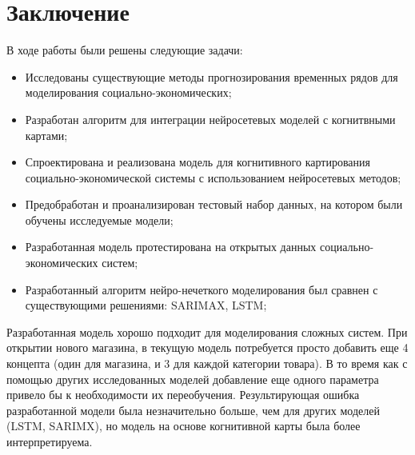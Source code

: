 \chapter*{Заключение}

В ходе работы были решены следующие задачи:



\begin{itemize}
	\item Исследованы существующие методы прогнозирования временных рядов для моделирования социально-экономических;
	\item Разработан алгоритм для интеграции нейросетевых моделей с когнитвными картами;
	\item Спроектирована и реализована модель для когнитивного картирования социально-экономической
	системы с использованием нейросетевых методов;
	\item Предобработан и проанализирован тестовый набор данных, на котором были обучены исследуемые модели;
	\item Разработанная модель протестирована на открытых данных социально-экономических систем;
	\item Разработанный алгоритм нейро-нечеткого моделирования был сравнен с существующими решениями: SARIMAX, LSTM;
\end{itemize}

Разработанная модель хорошо подходит для моделирования сложных систем.
При открытии нового магазина, в текущую модель потребуется просто добавить еще
4 концепта (один для магазина, и 3 для каждой категории товара). В то время
как с помощью других исследованных моделей добавление еще одного параметра
привело бы к необходимости их переобучения.
Результирующая ошибка разработанной модели была незначительно больше,
чем для других моделей (LSTM, SARIMX), но модель на основе когнитивной карты
была более интерпретируема.

